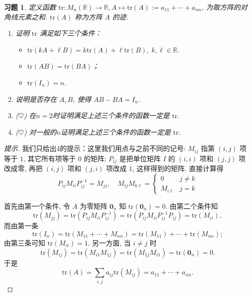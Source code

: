 \documentclass[UTF8]{ctexart}
\newcommand{\tr}{{\mathrm{tr}}}
\newtheorem{ex}[thm]{习题}
\begin{document}
\begin{ex}
	定义函数 $\tr: M_n(\mathbb{R}) \to \mathbb{R}, A \mapsto \tr(A):=a_{11}+ \cdots + a_{nn}$, 为取方阵的对角线元素之和. $\tr(A)$ 称为方阵 $A$ 的迹.
	\begin{enumerate}
		\item 证明 $\tr$ 满足如下三个条件：
		\begin{itemize}
			\item $\tr(kA+\ell B)=k\tr(A)+\ell\tr(B)$, $k,\ell \in \mathbb{R}.$
			\item $\tr(AB)=\tr(BA)$；
			\item $\tr(I_n)=n$.
		\end{itemize}
		\item 说明是否存在 $A, B$, 使得 $AB-BA=I_n$.
		 \item ($\heartsuit$)  在$n=2$时证明满足上述三个条件的函数一定是 $\tr$. 		\item ($\heartsuit$) 对一般的$n$证明满足上述三个条件的函数一定是 $\tr$.
	\end{enumerate}	
\end{ex}


\begin{proof}[提示]
我们只给出4的提示：这里我们用点与之前不同的记号: $M_{ij}$ 指第 $(i,j)$ 项等于 $1$, 其它所有项等于 $0$ 的矩阵; $P_{ij}$ 是把单位矩阵 $I$ 的 $(i,i)$ 项和 $(j,j)$ 项改成零, 再把 $(i,j)$ 项和 $(j,i)$ 项改成 $1$, 这样得到的矩阵. 直接计算得 $$P_{ij}M_{ii}P_{ij}^{-1}=M_{jj},\quad M_{ij}M_{k\ell}=\left\{\begin{array}{ll} 0  & j\neq k \\ M_{i\ell} & j=k\end{array}\right.$$
	
	首先由第一个条件, 令 $A$ 为零矩阵 ${\bm 0}_n$ 知 $\tr(\bm{0}_n)=0$. 由第二个条件知
	$$\tr(M_{jj})=\tr(P_{ij}M_{ii}P_{ij}^{-1})=\tr(P_{ij}M_{ii}P_{ij}^{-1}P_{ij})=\tr(M_{ii}),$$
	而由第一条
	$$\tr(I_n)=\tr(M_{11}+\cdots+M_{nn})=\tr(M_{11})+\cdots+\tr(M_{nn});$$
	由第三条可知 $\tr(M_{ii})=1$. 另一方面, 当 $i\neq j$ 时
	$$\tr(M_{ij})=\tr(M_{i1}M_{1j})=\tr(M_{1j}M_{i1})=\tr({\bm 0}_n)=0.$$
	于是
	$$	\tr(A)=\sum_{i,j}a_{ij}\tr(M_{ij})=a_{11}+\cdots+a_{nn}.$$
\end{proof}
\end{document}
